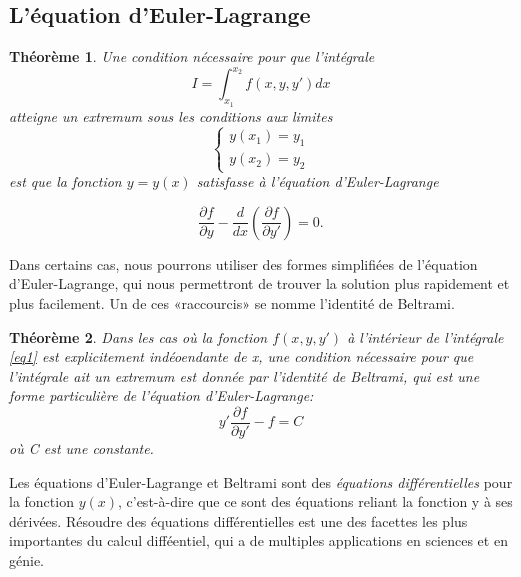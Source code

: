 \documentclass[10pt,a4paper]{article}%
\theoremstyle{theorem}
\newtheorem{theorem}{Théorème}
\theoremstyle{definition}
\begin{document}
		\subsection{L'équation d'Euler-Lagrange}
			\begin{theorem}
	  			Une condition nécessaire pour que l'intégrale
	  			\begin{equation}\label{eq1}
		   			I=\int_{x_1}^{x_2} f(x,y,y')dx
		   		\end{equation}
		   		atteigne un extremum sous les conditions aux limites 
		   			\begin{equation}\label{eq2}
		   				\begin{cases}
		   					y(x_1)=y_1
		   					\\
		   					y(x_2)=y_2
		   				\end{cases}
		   			\end{equation}
		    	est que la fonction $y=y(x)$ satisfasse à l'équation d'Euler-Lagrange
		    	
		    		
		  			 \begin{equation}\label{eq3}
		  			 	\frac{\partial f}{\partial y}- \frac{d}{dx}(\frac{\partial f}{\partial y'})=0.
		  			 \end{equation}
				\end{theorem}
	
			Dans certains cas, nous pourrons utiliser des formes simplifiées de l'équation d'Euler-Lagrange, qui nous permettront de trouver la solution plus rapidement et plus facilement. Un de ces «raccourcis» se nomme l'identité de Beltrami.	 
			
				\begin{theorem}
					 Dans les cas où la fonction $f(x,y,y')$ à l'intérieur de l'intégrale \eqref{eq1} est explicitement indéoendante de x, une condition nécessaire pour que l'intégrale ait un extremum est donnée par l'identité de Beltrami, qui est une forme particulière de l'équation d'Euler-Lagrange: 
					 \[y'\frac{\partial f}{\partial y'}-f=C\]
					 où C est une constante.
				\end{theorem}
			
			Les équations d'Euler-Lagrange et Beltrami sont des \textit{équations différentielles} pour la fonction $y(x)$, c'est-à-dire que ce sont des équations reliant la fonction y à ses dérivées. Résoudre des équations différentielles est une des facettes les plus importantes du calcul difféentiel, qui a de multiples applications en sciences et en génie.
			
\end{document}
